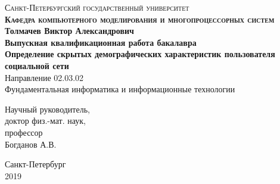 \thispagestyle{empty}

\begin{center}

\textsc{Санкт-Петербургский государственный университет \\
\textbf{Кафедра компьютерного моделирования и многопроцессорных систем}} \\ 
\vspace{3cm} 
\Large{\textbf{Толмачев Виктор Александрович}} \\
\vspace{1.5cm}
\large{\textbf{Выпускная квалификационная работа бакалавра}} \\ 
\vspace{2.5cm}
\Large{\textbf{Определение скрытых демографических характеристик пользователя социальной сети}} \\ 
\normalsize{Направление 02.03.02 \\
Фундаментальная информатика и информационные технологии} \\
\end{center}
\vspace{2.5cm}
\hspace{9cm} Научный руководитель, \\
\hspace*{9cm} доктор физ.-мат. наук, \\
\hspace*{9cm} профессор \\ 
\hspace*{9cm} Богданов А.В. 
\begin{center}
\vfill
Санкт-Петербург \\
2019
\end{center}

\clearpage